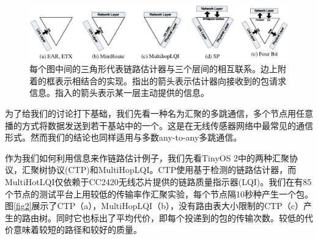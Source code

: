 \documentclass[12pt,a4paper]{article}
\begin{document}
\begin{figure}[ht]
\centering
\includegraphics[scale=0.7]{figures/fig1}
\caption{每个图中间的三角形代表链路估计器与三个层间的相互联系。边上附着的框表示相结合的实现。指出的箭头表示估计器向接收到的包请求信息。指入的箭头表示某一层主动提供的信息。}\label{fig1}
\end{figure}

为了给我们的讨论打下基础，我们先看一种名为{\kai 汇聚}的多跳通信，多个节点用任意播的方式将数据发送到若干基站中的一个。这是在无线传感器网络中最常见的通信形式。然而我们的结论也同样适用与多数any-to-any多跳通信。

作为我们如何利用信息来作链路估计例子，我们先看TinyOS 2中的两种汇聚协议，汇聚树协议(CTP)和MultiHopLQI。CTP使用基于检测的链路估计器，而MultiHotLQI仅依赖于CC2420无线芯片提供的链路质量指示器(LQI)。我们在有85个节点的测试平台上用较低的传输率作汇聚实验，每个节点隔10秒种产生一个包。图\ref{fig2}展示了CTP（a），MultiHopLQI（b），没有路由表大小限制的CTP（c）产生的路由树。同时它也标出了平均代价，即每个投递到的包的传输次数。较低的代价意味着较短的路径和较好的质量。
\end{document}
